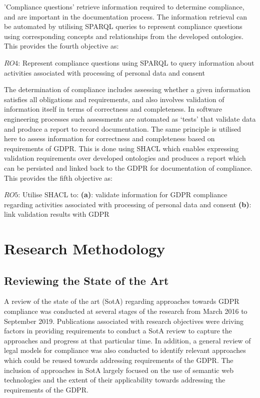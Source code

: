'Compliance questions' retrieve information required to determine compliance, and are important in the documentation process. The information retrieval can be automated by utilising SPARQL queries to represent compliance questions using corresponding concepts and relationships from the developed ontologies. This provides the fourth objective as:
\begin{framed}
$RO4$: Represent compliance questions using SPARQL to query information about activities associated with processing of personal data and consent
\end{framed}

The determination of compliance includes assessing whether a given information satisfies all obligations and requirements, and also involves validation of information itself in terms of correctness and completeness.
In software engineering processes such assessments are automated as `tests' that validate data and produce a report to record documentation.
The same principle is utilised here to assess information for correctness and completeness based on requirements of GDPR.
This is done using SHACL which enables expressing validation requirements over developed ontologies and produces a report which can be persisted and linked back to the GDPR for documentation of compliance.
This provides the fifth objective as:
\begin{framed}
$RO5$: Utilise SHACL to:
\newline\indent\indent\textbf{(a)}: validate information for GDPR compliance regarding activities associated with processing of personal data and consent
\newline\indent\indent\textbf{(b)}: link validation results with GDPR
\end{framed}

\section{Research Methodology}\label{sec:intro:research-methodology}
\subsection{Reviewing the State of the Art}
A review of the state of the art (SotA) regarding approaches towards GDPR compliance was conducted at several stages of the research from March 2016 to September 2019.
Publications associated with research objectives were driving factors in providing requirements to conduct a SotA review to capture the approaches and progress at that particular time.
In addition, a general review of legal models for compliance was also conducted to identify relevant approaches which could be reused towards addressing requirements of the GDPR.
The inclusion of approaches in SotA largely focused on the use of semantic web technologies and the extent of their applicability towards addressing the requirements of the GDPR.

